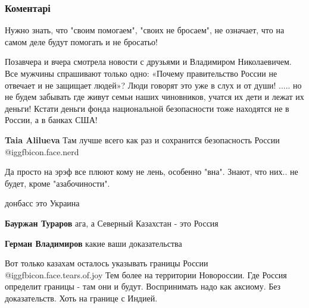  
 
 
 
 
\subsubsection{Коментарі}
\label{sec:01_11_2021.fb.vladimirov_german.1.obostrenie_donbass.cmt}

\begin{itemize} %

Нужно знать, что "своим помогаем", "своих не бросаем", не означает, что на
самом деле будут помогать и не бросатьо!


Позавчера и вчера смотрела новости с друзьями и Владимиром Николаевичем. Все
мужчины спрашивают только одно: «Почему правительство России не отвечает и не
защищает людей»? Люди говорят это уже в слух и от души! ..... но не будем
забывать где живут семьи наших чиновников, учатся их дети и лежат их деньги!
Кстати деньги фонда национальной безопасности тоже находятся не в России, а в
банках США!

\begin{itemize} %
\textbf{Taia Alilueva} Там лучше всего как раз и сохранится безопасность России  @igg{fbicon.face.nerd} 
\end{itemize} %

Да просто на эрэф все плюют кому не лень, особенно "вна".
Знают, что них.. не будет, кроме "азабочиности".

донбасс это Украина

\begin{itemize} %
\textbf{Бауржан Тураров} ага, а Северный Казахстан - это Россия

\textbf{Герман Владимиров} какие ваши доказательства

Вот только казахам осталось указывать границы России @igg{fbicon.face.tears.of.joy}  Тем более на территории Новороссии. Где Россия определит границы - там они и будут. Воспринимать надо как аксиому. Без доказательств. Хоть на границе с Индией.


\end{itemize}
\end{itemize}
